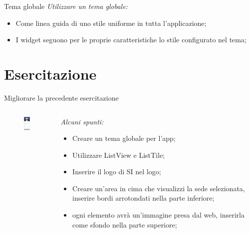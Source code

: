 \documentclass{../libs/presentation_format}
\begin{document}

\begin{frame}{Tema globale}
	\emph{Utilizzare un tema globale:}
	\begin{itemize}
		\item Come linea guida di uno stile uniforme in tutta l'applicazione;
		\item I widget seguono per le proprie caratteristiche lo stile configurato nel tema;
	\end{itemize}
	\centering
	\href{https://api.flutter.dev/flutter/material/ThemeData-class.html}{}
\end{frame}


\section{Esercitazione}
\begin{frame}{Migliorare la precedente esercitazione}
\begin{minipage}[0.2\textheight]{\textwidth}
		\begin{columns}[T]
			\begin{column}{0.4\textwidth}
				\begin{figure}[htpb]
					\centering
					\includegraphics[width=2cm]{../libs/assignment-2-home}
				\end{figure}
			\end{column}
			\begin{column}{0.6\textwidth}
				\emph{Alcuni spunti:}
				\begin{itemize}
					\item Creare un tema globale per l'app;
					\item Utilizzare ListView e ListTile;
					\item Inserire il logo di SI nel logo;
					\item Creare un'area in cima che visualizzi la sede selezionata, inserire bordi arrotondati nella parte inferiore;
					\item ogni elemento avrà un'immagine presa dal web, inserirla come sfondo nella parte superiore;
				\end{itemize}
			\end{column}
		\end{columns}
	\end{minipage}
\end{frame}
\end{document}
